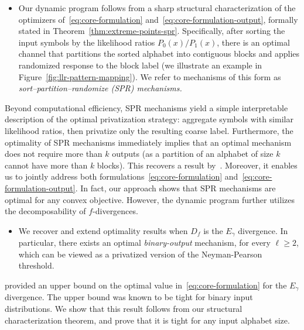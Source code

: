 \documentclass{article}
\theoremstyle{plain}
\theoremstyle{definition}
\theoremstyle{plain}
\begin{document}
\begin{itemize}
    \item[2)] Our dynamic program follows from a sharp structural characterization of the optimizers of~\eqref{eq:core-formulation} and~\eqref{eq:core-formulation-output}, formally stated in Theorem~\ref{thm:extreme-points-spr}. Specifically, after sorting the input symbols by the likelihood ratios $P_0(x)/P_1(x)$, there is an optimal channel that partitions the sorted alphabet into contiguous blocks and applies randomized response to the block label (we illustrate an example in Figure~\ref{fig:llr-pattern-mapping}). We refer to mechanisms of this form as \emph{sort--partition--randomize (SPR) mechanisms.}
\end{itemize}
Beyond computational efficiency, SPR mechanisms yield a simple interpretable description of the optimal privatization strategy: aggregate symbols with similar likelihood ratios, then privatize only the resulting coarse label. Furthermore, the optimality of SPR mechanisms immediately implies that an optimal mechanism does not require more than $k$ outputs (as a partition of an alphabet of size $k$ cannot have more than $k$ blocks). This recovers a result by~\citet{Kairouz2016ExtremalMechanisms}. Moreover, it enables us to jointly address both formulations~\eqref{eq:core-formulation} and~\eqref{eq:core-formulation-output}. In fact, our approach shows that SPR mechanisms are optimal for any convex objective. However, the dynamic program further utilizes the decomposability of $f$-divergences.

\begin{itemize}
    \item[3)] We recover and extend optimality results when $D_f$ is the $E_\gamma$ divergence. In particular, there exists an optimal \emph{binary-output} mechanism, for every $\ell \ge 2$, which can be viewed as a privatized version of the Neyman-Pearson threshold.
\end{itemize}
\citet{Zamanlooy2024E_gammaMixing} provided an upper bound on the optimal value in~\eqref{eq:core-formulation} for the $E_\gamma$ divergence. The upper bound was known to be tight for binary input distributions. We show that this result follows from our structural characterization theorem, and prove that it is tight for any input alphabet size.
\end{document}

